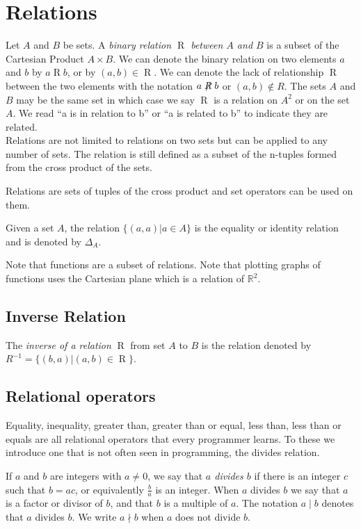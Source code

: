 \section {Relations}
\begin {definition}
Let $A$ and $B$ be sets. A \textit {binary relation $\mathrel{R}$ between $A$ and $B$} is a subset of the Cartesian Product $A \times B$. We can denote the binary relation on two elements $a$ and $b$ by $a\mathrel{R}b$, or by $(a,b)\in \mathrel{R}$. We can denote the lack of relationship $\mathrel{R}$ between the two elements with the notation $a\not\mathrel{R}b$ or $(a,b) \not \in R$. The sets $A$ and $B$ may be the same set in which case we say $\mathrel{R}$ is a relation on $A^2$ or on the set $A$. We read ``a is in relation to b'' or ``a is related to b'' to indicate they are related. \\

Relations are not limited to relations on two sets but can be applied to any number of sets. The relation is still defined as a subset of the n-tuples formed from the cross product of the sets.

Relations are sets of tuples of the cross product and set operators can be used on them.

Given a set $A$, the relation $\{(a,a)|a\in A\}$ is the equality or identity relation and is denoted by $\Delta_A$.
\end {definition} 

Note that functions are a subset of relations. Note that plotting graphs of functions uses the Cartesian plane which is a relation of $\mathbb{R}^2$. 

\subsection{Inverse Relation}
The \textit{inverse of a relation} $\mathrel{R}$ from set $A$ to $B$ is the relation denoted by $R^{-1} = \{(b,a)|(a,b)\in \mathrel{R}\}$.

    \subsection {Relational operators}
    Equality, inequality, greater than, greater than or equal, less than, less than or equals are all relational operators that every programmer learns. To these we introduce one that is not often seen in programming, the divides relation.
    
    \begin{definition}[Divides]
    If $a$ and $b$ are integers with $a\ne 0$, we say that \textit{$a$ divides $b$} if there is an integer $c$ such that $b = ac$, or equivalently $\frac{b}{a}$ is an integer. When $a$ divides $b$ we say that $a$ is a factor or divisor of $b$, and that $b$ is a multiple of $a$. The notation $a \mid b$ denotes that $a$ divides $b$. We write $a\nmid b$
when $a$ does not divide $b$.
    \end{definition}


